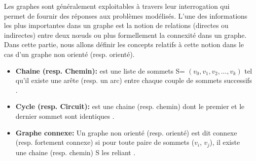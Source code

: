  
 
Les graphes sont généralement exploitables à travers leur interrogation qui permet de fournir des réponses aux problèmes modélisés. L'une des informations les plus importantes dans un graphe est la notion de relations (directes ou indirectes) entre deux nœuds ou plus formellement la connexité dans un graphe. Dans cette partie, nous allons définir les concepts relatifs à cette notion dans le cas d'un graphe non orienté (resp. orienté).
 \begin{itemize} [label = $\bullet$]
			 \item \textbf{Chaine (resp. Chemin):}
			est une liste de sommets S= $(v_{0},v_{1},v_{2},...,v_{k})$ tel qu'il existe une arête (resp. un arc) entre chaque couple de sommets successifs \citep{muller}.
			 
			 
			  \item \textbf{Cycle (resp. Circuit):} 
			 est une chaine (resp. chemin) dont le premier et le dernier sommet sont identiques \citep{DUT}.
			 
			 \item \textbf{Graphe connexe:}
			Un graphe non orienté (resp. orienté) est dit connexe (resp. fortement connexe) si pour toute paire de sommets ($v_{i}$, $v_{j}$), il existe une chaine (resp. chemin) S les reliant \citep{muller}.
		
		\end{itemize}